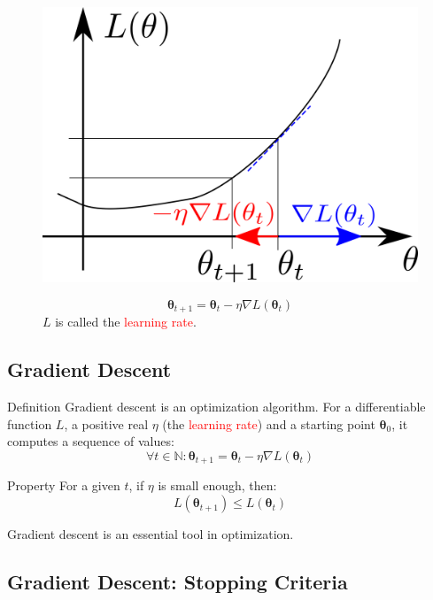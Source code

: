 \documentclass{book}
\newcommand{\lr}{\eta} %
\newcommand{\loss}{L}
\newcommand{\param}{\boldsymbol{\theta}}
\newcommand{\N}{\mathbb{N}}
\newcommand{\alert}[1]{\textcolor{red}{#1}}
\begin{document}
\begin{figure}[h]
    \centering
    \begin{minipage}{.5\textwidth}
        \centering
        \includegraphics[width=\textwidth]{gradient_descent}
    \end{minipage}%
    \begin{minipage}{.5\textwidth}
        \[
        \param_{t+1} = \param_t - \lr\nabla \loss(\param_t)
        \]
        $\loss$ is called the \alert{learning rate}.
    \end{minipage}
\end{figure}

\subsection{Gradient Descent}

\begin{myblock}{Definition}
Gradient descent is an optimization algorithm. For a differentiable function $\loss$, a positive real $\lr$ (the \alert{learning rate}) and a starting point $\param_0$, it computes a sequence of values:
\[
\forall t \in \N: \param_{t+1} = \param_t - \lr \nabla \loss(\param_t)
\]
\end{myblock}

\begin{myblock}{Property}
For a given $t$, if $\lr$ is small enough, then:
\[
\loss(\param_{t+1}) \leq \loss(\param_t)
\]
\end{myblock}

Gradient descent is an essential tool in optimization.

\subsection{Gradient Descent: Stopping Criteria}
\end{document}
